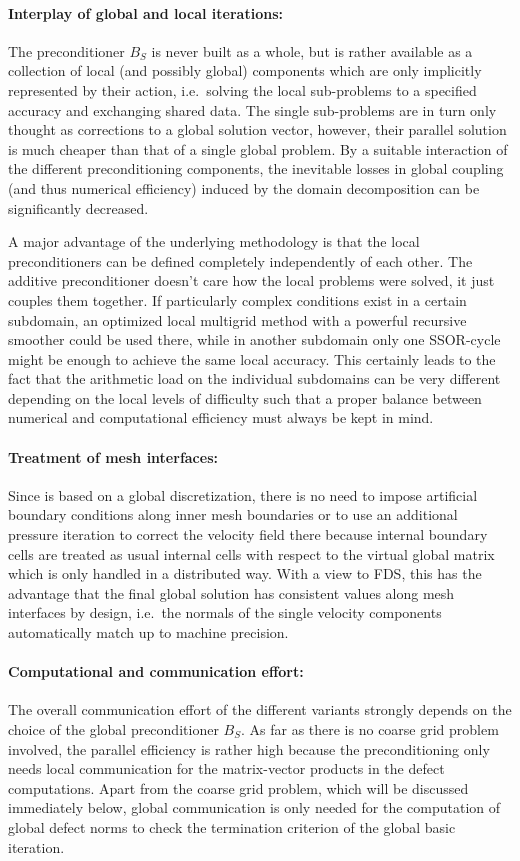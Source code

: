 \paragraph{Interplay of global and local iterations:}
The preconditioner $B_S$ is never built as a whole, but is rather available as a collection of local (and possibly global) components which are only implicitly represented by their action, i.e.\ solving the local sub-problems to a specified accuracy and exchanging shared data.
The single sub-problems are in turn only thought as corrections to a global solution vector, however, their parallel solution is much cheaper than that of a single global problem. By a suitable interaction of the different preconditioning components, the inevitable losses in global coupling (and thus numerical efficiency) induced by the domain decomposition can be significantly decreased.

A major advantage of the underlying methodology is that the local preconditioners can be defined completely independently of each other. The additive \ols{} preconditioner doesn't care how the local problems were solved, it just couples them together.
If particularly complex conditions exist in a certain subdomain, an optimized local multigrid method with a powerful recursive smoother could be used there, while in another subdomain only one SSOR-cycle might be enough to achieve the same local accuracy. This certainly leads to the fact that the arithmetic load on the individual subdomains can be very different depending on the local levels of difficulty such that a proper balance between numerical and computational efficiency must always be kept in mind.


\paragraph{Treatment of mesh interfaces:}
Since \scarc{} is based on a global discretization, there is no need to impose artificial boundary conditions along inner mesh boundaries or 
to use an additional pressure iteration to correct the velocity field there because internal boundary cells are treated as usual internal cells with respect to the virtual global matrix which is only handled in a distributed way. With a view to FDS, this has the advantage that the final global solution has consistent values along mesh interfaces by design, i.e.\ the normals of the single velocity components automatically match up to machine precision.

\paragraph{Computational and communication effort:}
The overall communication effort of the different variants strongly depends on the choice of the global preconditioner $B_S$. As far as there is no coarse grid problem involved, 
the parallel efficiency is rather high because the preconditioning only needs local communication for the matrix-vector products in the defect computations. Apart from the coarse grid problem, which will be discussed immediately below, global communication is only needed for the computation of global defect norms to check the termination criterion of the global basic iteration.

